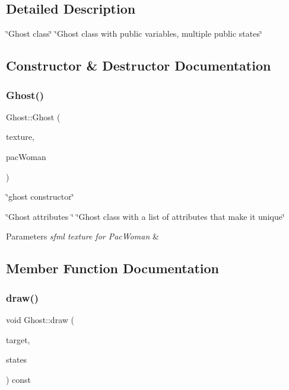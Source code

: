 \subsection{Detailed Description}
\char`\"{}\+Ghost class\char`\"{}  \char`\"{}\+Ghost class with public variables, multiple public states\char`\"{} 

\subsection{Constructor \& Destructor Documentation}
\mbox{\label{classGhost_ac56823314f8c39fc178a59982ad48d8a}} 
\subsubsection{\texorpdfstring{Ghost()}{Ghost()}}
{\footnotesize\ttfamily Ghost\+::\+Ghost (\begin{DoxyParamCaption}\item[{sf\+::\+Texture \&}]{texture,  }\item[{\hyperlink{classPacWoman}{Pac\+Woman} $\ast$}]{pac\+Woman }\end{DoxyParamCaption})}



\char`\"{}ghost constructor\char`\"{} 

\char`\"{}\+Ghost attributes \char`\"{}  \char`\"{}\+Ghost class with a list of attributes that make it unique\char`\"{}


\begin{DoxyParams}{Parameters}
{\em sfml texture for Pac\+Woman} & \\
\hline
\end{DoxyParams}


\subsection{Member Function Documentation}
\mbox{\label{classGhost_a6e53afb38446db1eac42cb6529e314ad}} 
\subsubsection{\texorpdfstring{draw()}{draw()}}
{\footnotesize\ttfamily void Ghost\+::draw (\begin{DoxyParamCaption}\item[{sf\+::\+Render\+Target \&}]{target,  }\item[{sf\+::\+Render\+States}]{states }\end{DoxyParamCaption}) const\hspace{0.3cm}{\ttfamily [private]}}



